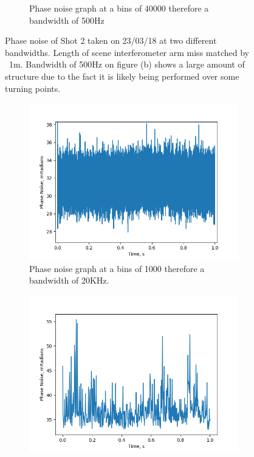 \documentclass[12pt,a4paper,oneside]{report}
\begin{document}
\begin{figure}
\begin{subfigure}{.5\textwidth}
    \caption{Phase noise graph at a bins of 40000 therefore a bandwidth of 500Hz}
  \end{subfigure}
\caption{Phase noise of Shot 2 taken on 23/03/18 at two different bandwidths. Length of scene interferometer arm miss matched by ~1m. Bandwidth of 500Hz on figure (b) shows a large amount of structure due to the fact it is likely being performed over some turning points.}
\label{fig:2-PN-shot-2-20180323-bw-1000-40000-unmatched}
\end{figure}

\begin{figure}
  \begin{subfigure}{.5\textwidth}
    \centering\captionsetup{width=.9\linewidth}
    \includegraphics[width=\textwidth,angle=0]{DImages/Phase_Noise_for_Scene_shot_8_with_bandwidth___1000_Date_20180323.png}
    \caption{Phase noise graph at a bins of 1000 therefore a bandwidth of 20KHz.}
  \end{subfigure}
  \begin{subfigure}{.5\textwidth}
    \centering\captionsetup{width=.9\linewidth}
    \includegraphics[width=\textwidth, angle=0]{DImages/Phase_Noise_for_Scene_shot_8_with_bandwidth___40000_Date_20180323.png}

\end{subfigure}
\end{figure}
\end{document}
